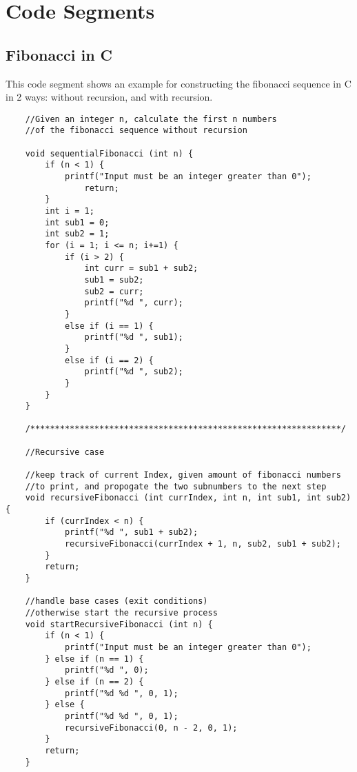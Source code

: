 \chapter{Code Segments}\label{app:CodeSegments}

\section{Fibonacci in C}\label{sec:FibC}

This code segment shows an example for constructing the fibonacci sequence in C in 2 ways: without recursion, and with recursion.

\begin{verbatim}
    //Given an integer n, calculate the first n numbers
    //of the fibonacci sequence without recursion
    
    void sequentialFibonacci (int n) {
        if (n < 1) {
            printf("Input must be an integer greater than 0");
                return;
        }
        int i = 1;
        int sub1 = 0;
        int sub2 = 1;
        for (i = 1; i <= n; i+=1) {
            if (i > 2) {
                int curr = sub1 + sub2;
                sub1 = sub2;
                sub2 = curr;
                printf("%d ", curr);
            }
            else if (i == 1) {
                printf("%d ", sub1);
            }
            else if (i == 2) {
                printf("%d ", sub2);
            }
        }
    }

    /***************************************************************/

    //Recursive case

    //keep track of current Index, given amount of fibonacci numbers
    //to print, and propogate the two subnumbers to the next step
    void recursiveFibonacci (int currIndex, int n, int sub1, int sub2) {
        if (currIndex < n) {
            printf("%d ", sub1 + sub2);
            recursiveFibonacci(currIndex + 1, n, sub2, sub1 + sub2);
        }
        return;
    }

    //handle base cases (exit conditions)
    //otherwise start the recursive process
    void startRecursiveFibonacci (int n) {
        if (n < 1) {
            printf("Input must be an integer greater than 0");
        } else if (n == 1) {
            printf("%d ", 0);
        } else if (n == 2) {
            printf("%d %d ", 0, 1);
        } else {
            printf("%d %d ", 0, 1);
            recursiveFibonacci(0, n - 2, 0, 1);
        }
        return;
    }
\end{verbatim}

